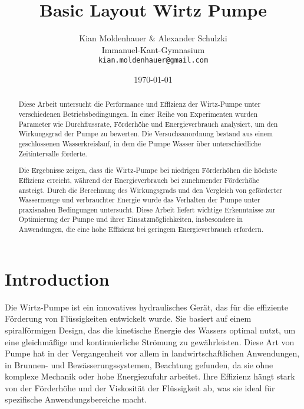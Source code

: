 \documentclass[12pt]{article}
\begin{document}
\title{Basic Layout Wirtz Pumpe}
\author{Kian Moldenhauer \& Alexander Schulzki\\Immanuel-Kant-Gymnasium\\\texttt{kian.moldenhauer@gmail.com}}
\date{\today} %
\maketitle

\begin{abstract}
Diese Arbeit untersucht die Performance und Effizienz der Wirtz-Pumpe unter verschiedenen Betriebsbedingungen. In einer Reihe von Experimenten wurden Parameter wie Durchflussrate, Förderhöhe und Energieverbrauch analysiert, um den Wirkungsgrad der Pumpe zu bewerten. Die Versuchsanordnung bestand aus einem geschlossenen Wasserkreislauf, in dem die Pumpe Wasser über unterschiedliche Zeitintervalle förderte.

Die Ergebnisse zeigen, dass die Wirtz-Pumpe bei niedrigen Förderhöhen die höchste Effizienz erreicht, während der Energieverbrauch bei zunehmender Förderhöhe ansteigt. Durch die Berechnung des Wirkungsgrads und den Vergleich von geförderter Wassermenge und verbrauchter Energie wurde das Verhalten der Pumpe unter praxisnahen Bedingungen untersucht. Diese Arbeit liefert wichtige Erkenntnisse zur Optimierung der Pumpe und ihrer Einsatzmöglichkeiten, insbesondere in Anwendungen, die eine hohe Effizienz bei geringem Energieverbrauch erfordern.
\end{abstract}

\tableofcontents  %
\newpage          %

\section{Introduction}
Die Wirtz-Pumpe ist ein innovatives hydraulisches Gerät, das für die effiziente Förderung von Flüssigkeiten entwickelt wurde. Sie basiert auf einem spiralförmigen Design, das die kinetische Energie des Wassers optimal nutzt, um eine gleichmäßige und kontinuierliche Strömung zu gewährleisten. Diese Art von Pumpe hat in der Vergangenheit vor allem in landwirtschaftlichen Anwendungen, in Brunnen- und Bewässerungssystemen, Beachtung gefunden, da sie ohne komplexe Mechanik oder hohe Energiezufuhr arbeitet. Ihre Effizienz hängt stark von der Förderhöhe und der Viskosität der Flüssigkeit ab, was sie ideal für spezifische Anwendungsbereiche macht.
\end{document}
